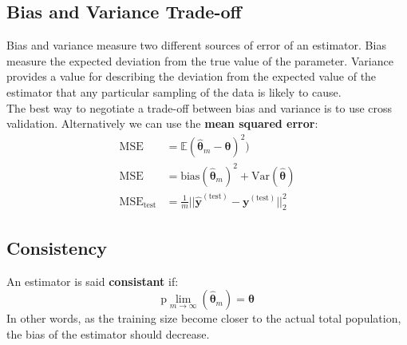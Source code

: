 \documentclass[12pt]{report}
\begin{document}
        \subsection{Bias and Variance Trade-off}    
            Bias and variance measure two different sources of error of an estimator. Bias measure the expected deviation from the true value of the parameter. Variance provides a value for describing the deviation from the expected value of the estimator that any particular sampling of the data is likely to cause.\\
            
            The best way to negotiate a trade-off between bias and variance is to use cross validation. Alternatively we can use the \textbf{mean squared error}:
            \begin{align}
             \text{MSE} &= \mathbb{E}(\hat{\boldsymbol{\theta}}_m -      \boldsymbol{\theta})^2) \\
             \text{MSE} &= \text{bias}(\hat{\boldsymbol{\theta}}_m)^2 + \text{Var}(\hat{\boldsymbol{\theta}}) \\
             \text{MSE}_{\text{test}} &= \frac{1}{m}||\boldsymbol{\hat{y}}^{(\text{test})} - \boldsymbol{y}^{(\text{test})} ||_2^2
            \end{align}
        \subsection{Consistency}
            An estimator is said \textbf{consistant} if:
            \begin{equation}
                \text{p}\lim_{m \rightarrow \infty}(\hat{\boldsymbol{\theta}}_m) = \boldsymbol{\theta}
            \end{equation}
            In other words, as the training size become closer to the actual total population, the bias of the estimator should decrease.
\end{document}
